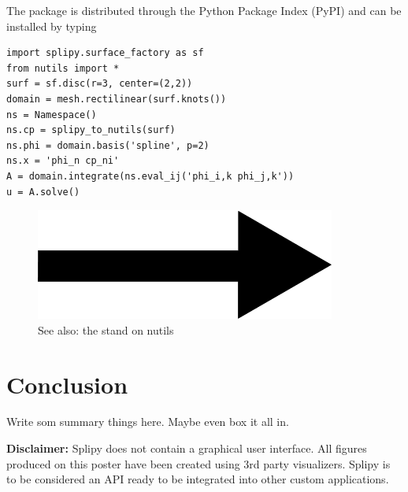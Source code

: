 \documentclass[landscape]{sintefposter}
\begin{document}
\begin{multicols}{3}
\begin{tcolorbox}[colback=white,colframe=sintefblue,title=Integration with Nutils]
  The package is distributed through the Python Package Index (PyPI) and can be installed by typing
  \begin{tcolorbox}[colback=sinteflightgrey]
  \begin{Verbatim}[fontsize=\small]
import splipy.surface_factory as sf
from nutils import *
surf = sf.disc(r=3, center=(2,2))
domain = mesh.rectilinear(surf.knots())
ns = Namespace()
ns.cp = splipy_to_nutils(surf)
ns.phi = domain.basis('spline', p=2)
ns.x = 'phi_n cp_ni'
A = domain.integrate(ns.eval_ij('phi_i,k phi_j,k'))
u = A.solve() \end{Verbatim}
  \end{tcolorbox}
  \begin{figure}
    \begin{center}
      \includegraphics[width=0.2\linewidth]{right.png} \\
      See also: the stand on nutils
    \end{center}
  \end{figure}
\end{tcolorbox}

\section{Conclusion}

Write som summary things here.
Maybe even box it all in.

{\small \textbf{Disclaimer:}
Splipy does not contain a graphical user interface.
All figures produced on this poster have been created using 3rd party visualizers.
Splipy is to be considered an API ready to be integrated into other custom applications.
}

\end{multicols}
\end{document}
